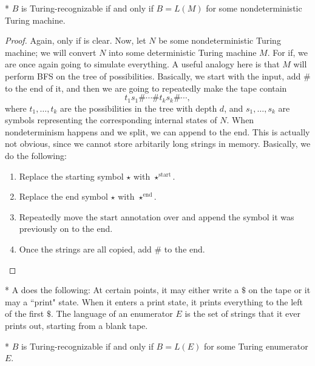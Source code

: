 \begin{thm}*
	$B$ is Turing-recognizable if and only if $B = L(M)$ for some nondeterministic Turing machine.
\end{thm}

\begin{proof}
	Again, only if is clear. Now, let $N$ be some nondeterministic Turing machine; we will convert $N$ into some deterministic Turing machine $M$.
	For if, we are once again going to simulate everything. A useful analogy here is that $M$ will perform BFS on the tree of possibilities.
	Basically, we start with the input, add $\#$ to the end of it, and then we are going to repeatedly make the tape contain \[
		t_1 s_1\# \cdots \# t_ks_k \#\cdots,
	\]where $t_1, \ldots, t_k$ are the possibilities in the tree with depth $d$, and $s_1, \ldots, s_k$ are symbols representing the corresponding internal states of $N$.
	When nondeterminism happens and we split, we can append to the end. This is actually not obvious, since we cannot store arbitarily long strings in memory. Basically, we do the following:
	\begin{enumerate}
		\item Replace the starting symbol $\star$ with $\star^{\text{start}}$.
		\item Replace the end symbol $\star$ with $\star^{\text{end}}$.
		\item Repeatedly move the $\text{start}$ annotation over and append the symbol it was previously on to the end.
		\item Once the strings are all copied, add $\#$ to the end.
	\end{enumerate}
\end{proof}	

\begin{defn}*
	A  does the following: At certain points, it may either write a $\$$ on the tape or it may a ``print" state. 
	When it enters a print state, it prints everything to the left of the first $\$$.
	The language of an enumerator $E$ is the set of strings that it ever prints out, starting from a blank tape.
\end{defn}

\begin{thm}*
	$B$ is Turing-recognizable if and only if $B = L(E)$ for some Turing enumerator $E$.
\end{thm}

